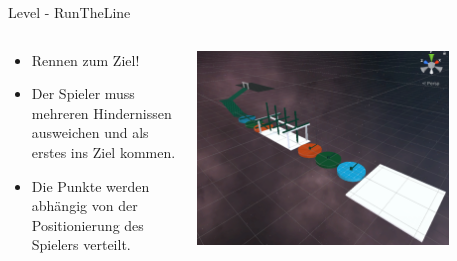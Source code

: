 \documentclass[xcolor=dvipsnames]{beamer}
\begin{document}
\begin{frame}{Level - RunTheLine}
\begin{columns}
\begin{column}{0.5\textwidth}
	\begin{itemize}
		\item Rennen zum Ziel!
		\item Der Spieler muss mehreren Hindernissen ausweichen und als erstes ins Ziel kommen.
		\item Die Punkte werden abhängig von der Positionierung des Spielers verteilt.
	\end{itemize}
\end{column}
\begin{column}{0.5\textwidth} 
	\begin{center}
		\includegraphics[width=0.8\textwidth]{Level_RunTheLine_view.png}
	\end{center}
	\begin{center}

\end{center}
\end{column}
\end{columns}
\end{frame}
\end{document}
